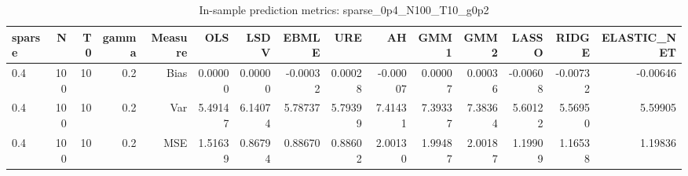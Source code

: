 \begin{table}[!htbp]\centering
\caption{In-sample prediction metrics: sparse_0p4_N100_T10_g0p2}
\label{tab:table2_sparse_0p4_N100_T10_g0p2}
\begin{tabular}{lrrrrrrrrrrrrrr}
\hline
sparse & N & T0 & gamma & Measure & OLS & LSDV & EBMLE & URE & AH & GMM1 & GMM2 & LASSO & RIDGE & ELASTIC_NET \\
\hline
0.4 & 100 & 10 & 0.2 & Bias & 0.00000 & 0.00000 & -0.00032 & 0.00028 & -0.00007 & 0.00007 & 0.00036 & -0.00608 & -0.00732 & -0.00646 \\
0.4 & 100 & 10 & 0.2 & Var & 5.49147 & 6.14074 & 5.78737 & 5.79399 & 7.41431 & 7.39337 & 7.38364 & 5.60122 & 5.56950 & 5.59905 \\
0.4 & 100 & 10 & 0.2 & MSE & 1.51639 & 0.86794 & 0.88670 & 0.88602 & 2.00130 & 1.99487 & 2.00187 & 1.19909 & 1.16538 & 1.19836 \\
\hline
\end{tabular}
\end{table}

